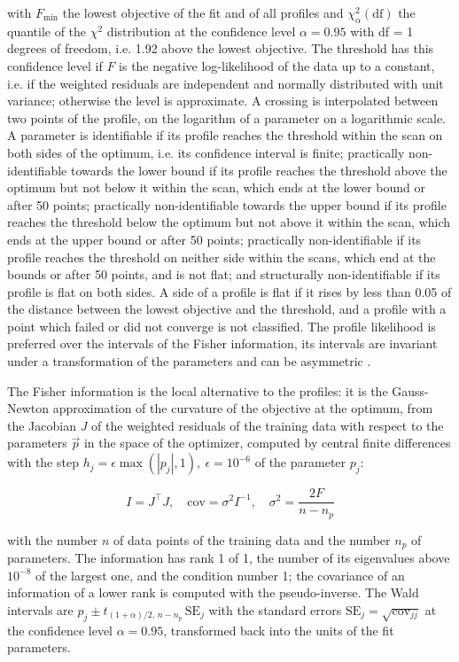 \documentclass{article}
\begin{document}
with $F_{\min}$ the lowest objective of the fit and of all profiles and $\chi^2_{\alpha}(\mathrm{df})$ the quantile of the $\chi^2$ distribution at the confidence level $\alpha = 0.95$ with df = 1 degrees of freedom, i.e. 1.92 above the lowest objective. The threshold has this confidence level if $F$ is the negative log-likelihood of the data up to a constant, i.e. if the weighted residuals are independent and normally distributed with unit variance; otherwise the level is approximate. A crossing is interpolated between two points of the profile, on the logarithm of a parameter on a logarithmic scale. A parameter is identifiable if its profile reaches the threshold within the scan on both sides of the optimum, i.e. its confidence interval is finite; practically non-identifiable towards the lower bound if its profile reaches the threshold above the optimum but not below it within the scan, which ends at the lower bound or after 50 points; practically non-identifiable towards the upper bound if its profile reaches the threshold below the optimum but not above it within the scan, which ends at the upper bound or after 50 points; practically non-identifiable if its profile reaches the threshold on neither side within the scans, which end at the bounds or after 50 points, and is not flat; and structurally non-identifiable if its profile is flat on both sides. A side of a profile is flat if it rises by less than 0.05 of the distance between the lowest objective and the threshold, and a profile with a point which failed or did not converge is not classified. The profile likelihood is preferred over the intervals of the Fisher information, its intervals are invariant under a transformation of the parameters and can be asymmetric \cite{Wieland2021}.

The Fisher information is the local alternative to the profiles: it is the Gauss-Newton approximation of the curvature of the objective at the optimum, from the Jacobian $J$ of the weighted residuals of the training data with respect to the parameters $\vec{p}$ in the space of the optimizer, computed by central finite differences with the step $h_j = \epsilon \max(|p_j|, 1),\ \epsilon = 10^{-6}$ of the parameter $p_j$:

\begin{equation}
I = J^\top J, \quad \mathrm{cov} = \sigma^2 I^{-1}, \quad \sigma^2 = \frac{2 F}{n - n_p}
\end{equation}

with the number $n$ of data points of the training data and the number $n_p$ of parameters. The information has rank 1 of 1, the number of its eigenvalues above $10^{-8}$ of the largest one, and the condition number 1; the covariance of an information of a lower rank is computed with the pseudo-inverse. The Wald intervals are $\hat{p}_j \pm t_{(1+\alpha)/2,\, n-n_p}\, \mathrm{SE}_j$ with the standard errors $\mathrm{SE}_j = \sqrt{\mathrm{cov}_{jj}}$ at the confidence level $\alpha = 0.95$, transformed back into the units of the fit parameters.
\end{document}
